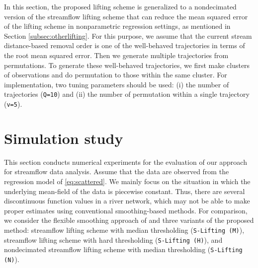 \documentclass[11pt,titlepage]{article}
\begin{document}
In this section, the proposed lifting scheme is generalized to a nondecimated version of the streamflow lifting scheme that can  reduce the mean squared error of the lifting scheme in nonparametric regression settings, as mentioned in Section \ref{subsec:otherlifting}. For this purpose, we assume that the current stream distance-based removal order is one of the well-behaved trajectories in terms of the root mean squared error. Then we generate multiple trajectories from permutations. To generate these well-behaved trajectories, we first make clusters of observations and do permutation to those within the same cluster. For implementation, two tuning parameters should be used: (i) the number of trajectories (\texttt{Q=10}) and (ii) the number of permutation within a single trajectory (\texttt{v=5}). %

\section{Simulation study}\label{sec:streamflowsimulationdata}

This section conducts numerical experiments for the evaluation of our approach for streamflow data analysis. Assume that the data are observed from the regression model of \ref{eq:scattered}. We mainly focus on the situation in which the underlying mean-field of the data is piecewise constant. Thus, there are several discontinuous function values in a river network, which may not be able to make proper estimates using conventional smoothing-based methods. For comparison, we consider the flexible smoothing approach of \cite{ODonnell2014} and three variants of the proposed method: streamflow lifting scheme with median thresholding (\texttt{S-Lifting (M)}), streamflow lifting scheme with hard thresholding (\texttt{S-Lifting (H)}), and nondecimated streamflow lifting scheme with median thresholding (\texttt{S-Lifting (N)}).
\end{document}
